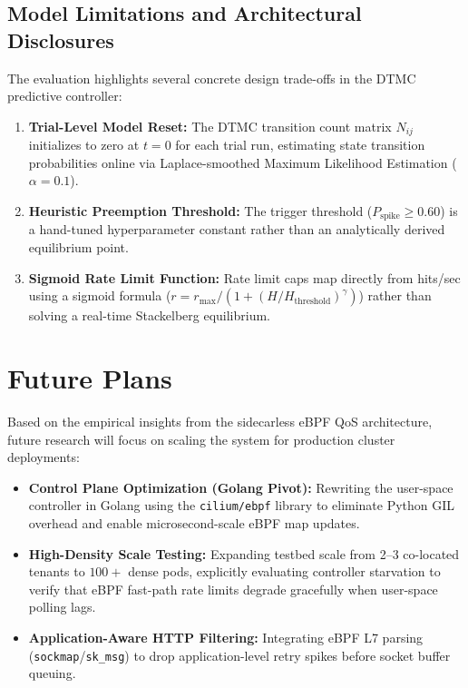 \subsection{Model Limitations and Architectural Disclosures}
The evaluation highlights several concrete design trade-offs in the DTMC predictive controller:
\begin{enumerate}
    \item \textbf{Trial-Level Model Reset:} The DTMC transition count matrix $N_{ij}$ initializes to zero at $t=0$ for each trial run, estimating state transition probabilities online via Laplace-smoothed Maximum Likelihood Estimation ($\alpha = 0.1$).
    \item \textbf{Heuristic Preemption Threshold:} The trigger threshold ($P_{\text{spike}} \ge 0.60$) is a hand-tuned hyperparameter constant rather than an analytically derived equilibrium point.
    \item \textbf{Sigmoid Rate Limit Function:} Rate limit caps map directly from hits/sec using a sigmoid formula ($r = r_{\text{max}} / (1 + (H / H_{\text{threshold}})^\gamma)$) rather than solving a real-time Stackelberg equilibrium.
\end{enumerate}

\section{Future Plans}

Based on the empirical insights from the sidecarless eBPF QoS architecture, future research will focus on scaling the system for production cluster deployments:

\begin{itemize}
    \item \textbf{Control Plane Optimization (Golang Pivot):} Rewriting the user-space controller in Golang using the \texttt{cilium/ebpf} library to eliminate Python GIL overhead and enable microsecond-scale eBPF map updates.
    \item \textbf{High-Density Scale Testing:} Expanding testbed scale from 2--3 co-located tenants to $100+$ dense pods, explicitly evaluating controller starvation to verify that eBPF fast-path rate limits degrade gracefully when user-space polling lags.
    \item \textbf{Application-Aware HTTP Filtering:} Integrating eBPF L7 parsing (\texttt{sockmap}/\texttt{sk\_msg}) to drop application-level retry spikes before socket buffer queuing.
\end{itemize}